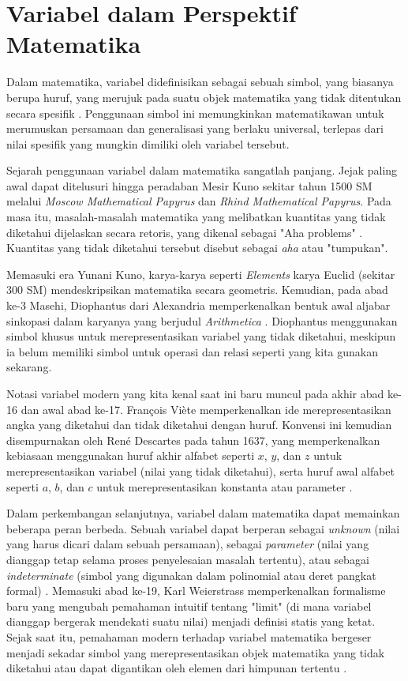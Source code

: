 \documentclass[11pt,a4paper]{article}
\begin{document}
\section{Variabel dalam Perspektif Matematika}

Dalam matematika, variabel didefinisikan sebagai sebuah simbol, yang biasanya berupa huruf, yang merujuk pada suatu objek matematika yang tidak ditentukan secara spesifik \cite{sobolev}. Penggunaan simbol ini memungkinkan matematikawan untuk merumuskan persamaan dan generalisasi yang berlaku universal, terlepas dari nilai spesifik yang mungkin dimiliki oleh variabel tersebut.

Sejarah penggunaan variabel dalam matematika sangatlah panjang. Jejak paling awal dapat ditelusuri hingga peradaban Mesir Kuno sekitar tahun 1500 SM melalui \textit{Moscow Mathematical Papyrus} dan \textit{Rhind Mathematical Papyrus}. Pada masa itu, masalah-masalah matematika yang melibatkan kuantitas yang tidak diketahui dijelaskan secara retoris, yang dikenal sebagai "Aha problems" \cite{wikipedia_math}. Kuantitas yang tidak diketahui tersebut disebut sebagai \textit{aha} atau "tumpukan".

Memasuki era Yunani Kuno, karya-karya seperti \textit{Elements} karya Euclid (sekitar 300 SM) mendeskripsikan matematika secara geometris. Kemudian, pada abad ke-3 Masehi, Diophantus dari Alexandria memperkenalkan bentuk awal aljabar sinkopasi dalam karyanya yang berjudul \textit{Arithmetica} \cite{boyer}. Diophantus menggunakan simbol khusus untuk merepresentasikan variabel yang tidak diketahui, meskipun ia belum memiliki simbol untuk operasi dan relasi seperti yang kita gunakan sekarang.

Notasi variabel modern yang kita kenal saat ini baru muncul pada akhir abad ke-16 dan awal abad ke-17. François Viète memperkenalkan ide merepresentasikan angka yang diketahui dan tidak diketahui dengan huruf. Konvensi ini kemudian disempurnakan oleh René Descartes pada tahun 1637, yang memperkenalkan kebiasaan menggunakan huruf akhir alfabet seperti \(x\), \(y\), dan \(z\) untuk merepresentasikan variabel (nilai yang tidak diketahui), serta huruf awal alfabet seperti \(a\), \(b\), dan \(c\) untuk merepresentasikan konstanta atau parameter \cite{wikipedia_math}.

Dalam perkembangan selanjutnya, variabel dalam matematika dapat memainkan beberapa peran berbeda. Sebuah variabel dapat berperan sebagai \textit{unknown} (nilai yang harus dicari dalam sebuah persamaan), sebagai \textit{parameter} (nilai yang dianggap tetap selama proses penyelesaian masalah tertentu), atau sebagai \textit{indeterminate} (simbol yang digunakan dalam polinomial atau deret pangkat formal) \cite{wikipedia_math}. Memasuki abad ke-19, Karl Weierstrass memperkenalkan formalisme baru yang mengubah pemahaman intuitif tentang "limit" (di mana variabel dianggap bergerak mendekati suatu nilai) menjadi definisi statis yang ketat. Sejak saat itu, pemahaman modern terhadap variabel matematika bergeser menjadi sekadar simbol yang merepresentasikan objek matematika yang tidak diketahui atau dapat digantikan oleh elemen dari himpunan tertentu \cite{wikipedia_math}.
\end{document}
